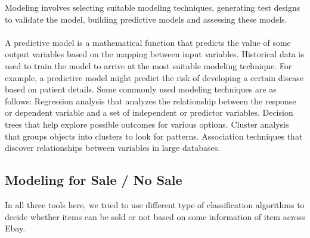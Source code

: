 \documentclass[CEJM,PDF]{cej} %
\begin{document}
Modeling involves selecting suitable modeling techniques, generating test designs to validate the model, building predictive models and assessing these models.\\
\\
A predictive model is a mathematical function that predicts the value of some output variables based on the mapping between input variables. Historical data is used to train the model to arrive at the most suitable modeling technique. For example, a predictive model might predict the risk of developing a certain disease based on patient details. Some commonly used modeling techniques are as follows: Regression analysis that analyzes the relationship between the response or dependent variable and a set of independent or predictor variables. Decision trees that help explore possible outcomes for various options. Cluster analysis that groups objects into clusters to look for patterns. Association techniques that discover relationships between variables in large databases.


\subsection{Modeling for Sale / No Sale}
In all three tools here, we tried to use different type of classification algorithms to decide whether items can be sold or not based on some information of item across Ebay.
\\
\end{document}
